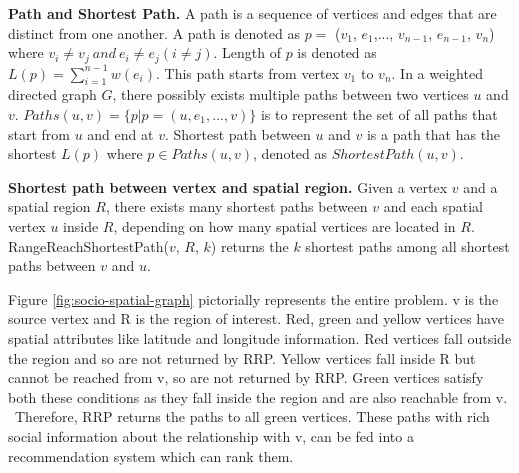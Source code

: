 \textbf{Path and Shortest Path.} A path is a sequence of vertices and edges that are distinct from one another. A path is denoted as $p =$ ($v_1$, $e_1$,..., $v_{n-1}$, $e_{n-1}$, $v_n$) where $v_i\neq v_j~and~e_i\neq e_j (i\neq j)$. Length of $p$ is denoted as $L(p) = \sum\limits_{i = 1}^{n-1}w(e_i)$. This path starts from vertex $v_1$ to $v_n$. In a weighted directed graph $G$, there possibly exists multiple paths between two vertices $u$ and $v$. $Paths(u,v) = \{p|p = (u,e_1,..., v)\}$ is to represent the set of all paths that start from $u$ and end at $v$. Shortest path between $u$ and $v$ is a path that has the shortest $L(p)$ where $p\in Paths(u,v)$, denoted as $ShortestPath(u,v)$.

\textbf{Shortest path between vertex and spatial region.} Given a vertex $v$ and a spatial region $R$, there exists many shortest paths between $v$ and each spatial vertex $u$ inside $R$, depending on how many spatial vertices are located in $R$. RangeReachShortestPath($v$, $R$, $k$) returns the $k$ shortest paths among all shortest paths between $v$ and $u$.

Figure \ref{fig:socio-spatial-graph} pictorially represents the entire problem. v is the source vertex and R is the region of interest. Red, green and yellow vertices have spatial attributes like latitude and longitude information. Red vertices fall outside the region and so are not returned by RRP. Yellow vertices fall inside R but cannot be reached from v, so are not returned by RRP. Green vertices satisfy both these conditions as they fall inside the region and are also reachable from v. ~Therefore, RRP returns the paths to all green vertices. These paths with rich social information about the relationship with v, can be fed into a recommendation system which can rank them.

